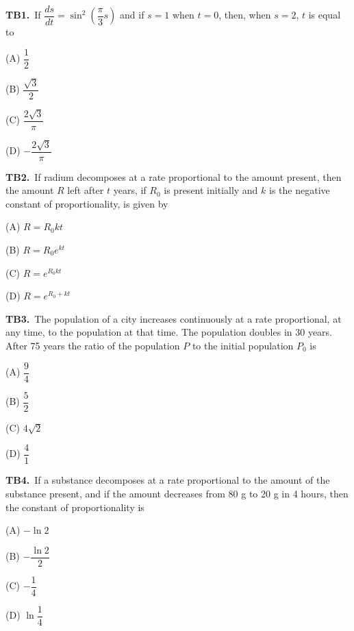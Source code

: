 \documentclass[11pt]{article}
\begin{document}
\bigskip\noindent\textbf{TB1.}\ If $\dfrac{ds}{dt}=\sin^2\left(\dfrac{\pi}{3}s\right)$ and if $s=1$ when $t=0$, then, when $s=2$, $t$ is equal to
\begin{list}{}{\setlength{\leftmargin}{3em}\setlength{\labelwidth}{2.5em}\setlength{\itemsep}{0pt}\setlength{\topsep}{2pt}}
\item[(A)] $\dfrac{1}{2}$
\item[(B)] $\dfrac{\sqrt{3}}{2}$
\item[(C)] $\dfrac{2\sqrt{3}}{\pi}$
\item[(D)] $-\dfrac{2\sqrt{3}}{\pi}$
\end{list}

\bigskip\noindent\textbf{TB2.}\ If radium decomposes at a rate proportional to the amount present, then the amount $R$ left after $t$ years, if $R_0$ is present initially and $k$ is the negative constant of proportionality, is given by
\begin{list}{}{\setlength{\leftmargin}{3em}\setlength{\labelwidth}{2.5em}\setlength{\itemsep}{0pt}\setlength{\topsep}{2pt}}
\item[(A)] $R=R_0 kt$
\item[(B)] $R=R_0 e^{kt}$
\item[(C)] $R=e^{R_0 kt}$
\item[(D)] $R=e^{R_0+kt}$
\end{list}

\bigskip\noindent\textbf{TB3.}\ The population of a city increases continuously at a rate proportional, at any time, to the population at that time. The population doubles in 30 years. After 75 years the ratio of the population $P$ to the initial population $P_0$ is
\begin{list}{}{\setlength{\leftmargin}{3em}\setlength{\labelwidth}{2.5em}\setlength{\itemsep}{0pt}\setlength{\topsep}{2pt}}
\item[(A)] $\dfrac{9}{4}$
\item[(B)] $\dfrac{5}{2}$
\item[(C)] $4\sqrt{2}$
\item[(D)] $\dfrac{4}{1}$
\end{list}

\bigskip\noindent\textbf{TB4.}\ If a substance decomposes at a rate proportional to the amount of the substance present, and if the amount decreases from 80 g to 20 g in 4 hours, then the constant of proportionality is
\begin{list}{}{\setlength{\leftmargin}{3em}\setlength{\labelwidth}{2.5em}\setlength{\itemsep}{0pt}\setlength{\topsep}{2pt}}
\item[(A)] $-\ln 2$
\item[(B)] $-\dfrac{\ln 2}{2}$
\item[(C)] $-\dfrac{1}{4}$
\item[(D)] $\ln\dfrac{1}{4}$
\end{list}
\end{document}
